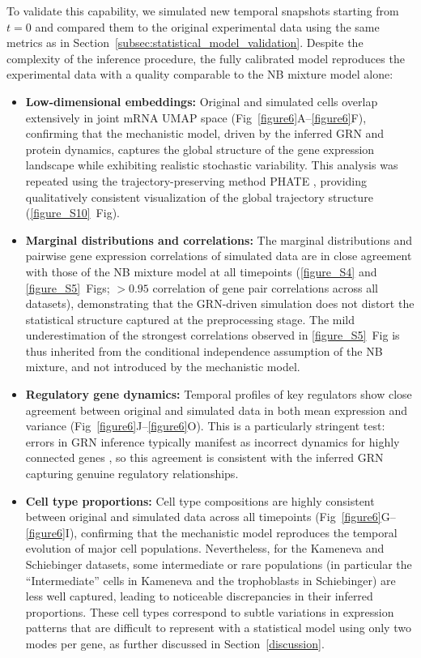 \documentclass[a4paper, 11pt]{article}
\theoremstyle{plain}
\theoremstyle{remark}
\newcommand*{\firstreview}[1]{{\color{black}#1}}
\begin{document}
To validate this capability, we simulated new temporal snapshots starting from 
$t=0$ and compared them to the original experimental data using the same metrics 
as in Section~\ref{subsec:statistical_model_validation}. Despite the 
complexity of the inference procedure, the fully calibrated model reproduces the 
experimental data with a quality comparable to the NB mixture model alone:
\begin{itemize}
\item \textbf{Low-dimensional embeddings:} Original and simulated cells overlap 
extensively in joint mRNA UMAP space (Fig~\ref{figure6}A--\ref{figure6}F), confirming that the 
mechanistic model, driven by the inferred GRN and protein dynamics, 
captures the global structure of the gene expression landscape while 
exhibiting realistic stochastic variability. \firstreview{This analysis was repeated using the trajectory-preserving method PHATE \cite{Moon2019}, providing qualitatively consistent visualization of the global trajectory structure (\ref{figure_S10}~Fig).}

\item \textbf{Marginal distributions and correlations:} The marginal distributions and 
pairwise gene expression correlations of simulated data are in close agreement 
with those of the NB mixture model at all timepoints (\ref{figure_S4} and 
\ref{figure_S5}~Figs; $>0.95$ correlation of gene pair correlations across all datasets), 
demonstrating that the GRN-driven simulation does not distort the statistical 
structure captured at the preprocessing stage. The mild underestimation of the 
strongest correlations observed in \ref{figure_S5}~Fig is thus inherited from 
the conditional independence assumption of the NB mixture, and not introduced 
by the mechanistic model.

\item \textbf{Regulatory gene dynamics:} Temporal profiles of key regulators show 
close agreement between original and simulated data in both mean expression 
and variance (Fig~\ref{figure6}J--\ref{figure6}O). This is a particularly stringent test: 
errors in GRN inference typically manifest as incorrect dynamics for highly 
connected genes \cite{ventre2023one}, so this agreement is consistent with the inferred GRN capturing genuine regulatory relationships.

\item \textbf{Cell type proportions:} Cell type compositions are highly consistent between original and simulated data across all timepoints (Fig~\ref{figure6}G--\ref{figure6}I), confirming that the mechanistic model reproduces the temporal evolution of major cell populations. Nevertheless, for the Kameneva and Schiebinger datasets, some intermediate or rare populations (in particular the “Intermediate” cells in Kameneva and the trophoblasts in Schiebinger) are less well captured, leading to noticeable discrepancies in their inferred proportions. These cell types correspond to subtle variations in expression patterns that are difficult to represent with a statistical model using only two modes per gene, as further discussed in Section~\ref{discussion}.


\end{itemize}
\end{document}
